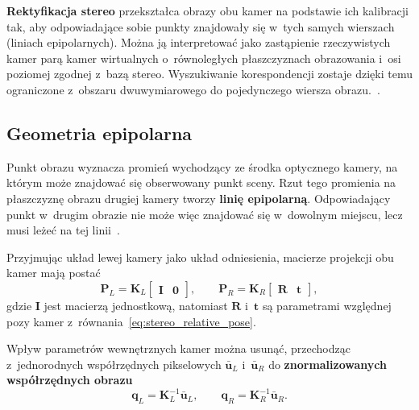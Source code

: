 \textbf{Rektyfikacja stereo} przekształca obrazy obu kamer na podstawie ich kalibracji tak, aby odpowiadające sobie punkty znajdowały się w~tych samych wierszach (liniach epipolarnych). Można ją interpretować jako zastąpienie rzeczywistych kamer parą kamer wirtualnych o~równoległych płaszczyznach obrazowania i~osi poziomej zgodnej z~bazą stereo. Wyszukiwanie korespondencji zostaje dzięki temu ograniczone z~obszaru dwuwymiarowego do pojedynczego wiersza obrazu.~\cite{fusiello2000rectification}.

\subsection{Geometria epipolarna}
\label{subsec:geometria_epipolarna}

Punkt obrazu wyznacza promień wychodzący ze środka optycznego kamery, na którym może znajdować się obserwowany punkt sceny. Rzut tego promienia na płaszczyznę obrazu drugiej kamery tworzy \textbf{linię epipolarną}. Odpowiadający punkt w~drugim obrazie nie może więc znajdować się w~dowolnym miejscu, lecz musi leżeć na tej linii~\cite{fusiello2000rectification}.

Przyjmując układ lewej kamery jako układ odniesienia, macierze projekcji obu kamer mają postać
\begin{equation}
\mathbf{P}_L
=
\mathbf{K}_L
\begin{bmatrix}
\mathbf{I} & \mathbf{0}
\end{bmatrix},
\qquad
\mathbf{P}_R
=
\mathbf{K}_R
\begin{bmatrix}
\mathbf{R} & \mathbf{t}
\end{bmatrix},
\label{eq:stereo_projection_matrices}
\end{equation}
gdzie $\mathbf{I}$ jest macierzą jednostkową, natomiast $\mathbf{R}$ i~$\mathbf{t}$ są parametrami względnej pozy kamer z~równania~\eqref{eq:stereo_relative_pose}.

Wpływ parametrów wewnętrznych kamer można usunąć, przechodząc z~jednorodnych współrzędnych pikselowych $\bar{\mathbf{u}}_L$ i~$\bar{\mathbf{u}}_R$ do \textbf{znormalizowanych współrzędnych obrazu}
\begin{equation}
\mathbf{q}_L
=
\mathbf{K}_L^{-1}\bar{\mathbf{u}}_L,
\qquad
\mathbf{q}_R
=
\mathbf{K}_R^{-1}\bar{\mathbf{u}}_R.
\label{eq:normalized_image_coordinates}
\end{equation}


